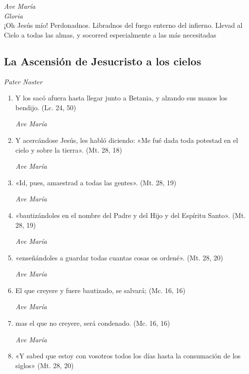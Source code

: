 \documentclass[a4paper,11pt, oneside]{report}
\begin{document}
      \textit{Ave María} \\
      \indent\textit{Gloria} \\
      \indent¡Oh Jesús mío! Perdonadnos. Libradnos del fuego enterno del infierno. Llevad al Cielo a todas las almas, y socorred especialmente a las más 
      necesitadas

    \subsection*{ La Ascensión de Jesucristo a los cielos }
        
      \textit{Pater Noster}

      \begin{enumerate} 

        \item Y los sacó afuera hasta llegar junto a Betania, y alzando sus manos los bendijo. (Lc. 24, 50)

        \textit{Ave María}

        \item Y acercándose Jesús, les habló diciendo: «Me fué dada toda potestad en el cielo y sobre la tierra». (Mt. 28, 18)

        \textit{Ave María}

        \item «Id, pues, amaestrad a todas las gentes». (Mt. 28, 19)

        \textit{Ave María}

        \item «bautizándoles en el nombre del Padre y del Hijo y del Espíritu Santo». (Mt. 28, 19)

        \textit{Ave María}

        \item «enseñándoles a guardar todas cuantas cosas os ordené». (Mt. 28, 20)

        \textit{Ave María}

        \item El que creyere y fuere bautizado, se salvará; (Mc. 16, 16)

        \textit{Ave María}

        \item mas el que no creyere, será condenado. (Mc. 16, 16)

        \textit{Ave María}

        \item «Y sabed que estoy con vosotros todos los días hasta la consumación de los siglos» (Mt. 28, 20)


\end{enumerate}
\end{document}
